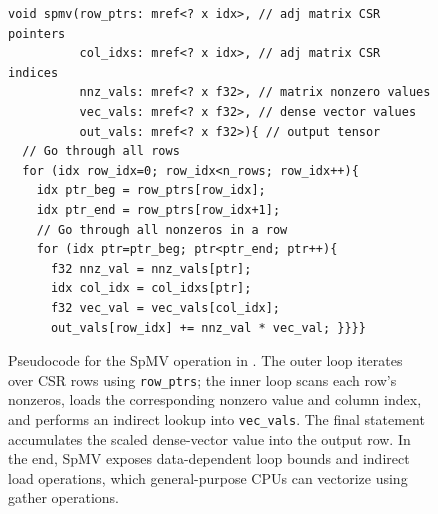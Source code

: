 \begin{figure}
    \begin{lstlisting}[]
void spmv(row_ptrs: mref<? x idx>, // adj matrix CSR pointers
          col_idxs: mref<? x idx>, // adj matrix CSR indices
          nnz_vals: mref<? x f32>, // matrix nonzero values
          vec_vals: mref<? x f32>, // dense vector values
          out_vals: mref<? x f32>){ // output tensor
  // Go through all rows
  for (idx row_idx=0; row_idx<n_rows; row_idx++){
    idx ptr_beg = row_ptrs[row_idx];
    idx ptr_end = row_ptrs[row_idx+1];
    // Go through all nonzeros in a row
    for (idx ptr=ptr_beg; ptr<ptr_end; ptr++){
      f32 nnz_val = nnz_vals[ptr];
      idx col_idx = col_idxs[ptr];
      f32 vec_val = vec_vals[col_idx];
      out_vals[row_idx] += nnz_val * vec_val; }}}}
    \end{lstlisting}
    \vspace{-1em}
    \caption[Pseudocode of sparse matrix-vector multiplication.]{Pseudocode for the SpMV operation in . The outer loop iterates over CSR rows using \texttt{row\_ptrs}; the inner loop scans each row's nonzeros, loads the corresponding nonzero value and column index, and performs an indirect lookup into \texttt{vec\_vals}. The final statement accumulates the scaled dense-vector value into the output row. In the end, SpMV exposes data-dependent loop bounds and indirect load operations, which general-purpose CPUs can vectorize using gather operations.}
    \label{fig:background-spmv-pseudocode}
\end{figure}
